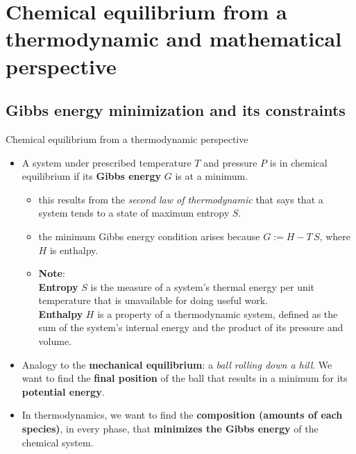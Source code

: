 
\section{Chemical equilibrium from a thermodynamic and mathematical perspective}

\subsection{Gibbs energy minimization and its constraints}
%
\begin{frame}{Chemical equilibrium from a thermodynamic perspective}
\begin{itemize}
\item A system under prescribed temperature $T$ and pressure $P$ is in
chemical equilibrium if its \textbf{Gibbs energy} $G$ is at a minimum. 
\begin{itemize}
\item this results from the \emph{second law of thermodynamic} that says
that a system tends to a state of maximum entropy $S$. 
\item the minimum Gibbs energy condition arises because $G := H - T\,S$, where
$H$ is enthalpy. 
\item \textbf{Note}: \\
\alert{\textbf{Entropy}} $S$ is the measure of a system's thermal energy per unit temperature that is unavailable for doing useful work. \\ 
\alert{\textbf{Enthalpy}} $H$ is a property of a thermodynamic system, defined as the sum of the system's internal energy and the product of its pressure and volume.
\end{itemize}
\pause
\item Analogy to the \textbf{mechanical equilibrium}: a \emph{ball rolling down a hill}. 
We want to find the \textbf{final position} of the ball that results in a minimum for its 
\textbf{potential energy}.
\pause
\item In thermodynamics, we want to find the \textbf{composition (amounts of each species)}, in every phase, that \textbf{minimizes the Gibbs energy} of the chemical system.
\end{itemize}
\end{frame}
%
